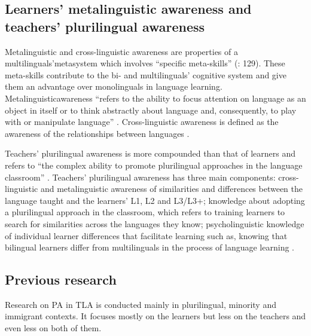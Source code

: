 \documentclass[output=paper]{../langscibook}
\begin{document}
\subsection{Learners’ metalinguistic awareness and teachers’ plurilingual awareness}



Metalinguistic and cross-linguistic awareness are properties of a multilinguals'\linebreak metasystem which involves “specific meta-skills” (\citealt{HerdinaJessner2002}: 129). These meta-skills contribute to the bi- and multilinguals’ cognitive system and give them an advantage over monolinguals in language learning. Metalinguistic\linebreak awareness “refers to the ability to focus attention on language as an object in itself or to think abstractly about language and, consequently, to play with or manipulate language” \citep[42]{Jessner2006}. Cross-linguistic awareness is defined as the awareness of the relationships between languages \citep[116]{Jessner2006}.

Teachers’ plurilingual awareness is more compounded than that of learners and refers to “the complex ability to promote plurilingual approaches in the language classroom” \citep[103]{Otwinowska2014}. Teachers’ plurilingual awareness has three main components: cross-linguistic and metalinguistic awareness of similarities and differences between the language taught and the learners’ L1, L2 and L3/L3+; knowledge about adopting a plurilingual approach in the classroom, which refers to training learners to search for similarities across the languages they know; psycholinguistic knowledge of individual learner differences that facilitate learning such as, knowing that bilingual learners differ from multilinguals in the process of language learning \citep{Otwinowska2014}.



\subsection{Previous research}



Research on PA in TLA is conducted mainly in plurilingual, minority and immigrant contexts. It focuses mostly on the learners but less on the teachers and even less on both of them.
\end{document}

